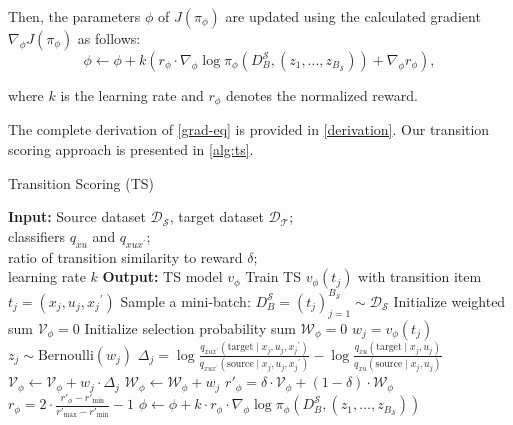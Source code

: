 Then, the parameters $\phi$ of $J\left(\pi_{\phi}\right)$ are updated using the calculated gradient $\nabla_{\phi} J\left(\pi_{\phi}\right)$ as follows:
\begin{equation}
\label{eq:phi_update}
\phi \leftarrow \phi + k \left(r_{\phi} \cdot \nabla_{\phi} \log \pi_{\phi}(D_B^{\mathcal{S}}, (z_1, \ldots, z_{B_{\mathcal{S}}})) + \nabla_{\phi} r_\phi \right),
\end{equation}

where $k$ is the learning rate and $r_{\phi}$ denotes the normalized reward. 

The complete derivation of \autoref{grad-eq} is provided in \autoref{derivation}. Our transition scoring approach is presented in \autoref{alg:ts}.


\begin{algorithm}[!ht]
\caption{Transition Scoring (TS)}
\label{alg:ts}
\begin{algorithmic}[1]
\State \textbf{Input:} Source dataset $\mathcal{D_S}$, target dataset $\mathcal{D_T}$; \\classifiers $q_{xu}$  and $q_{xu{x}^{\prime}}$; \\ratio of transition similarity to reward $\delta$; \\learning rate $k$
\State \textbf{Output:} TS model $v_{\phi}$
\State Train TS $v_{\phi}(t_j)$ with transition item $t_j = (x_j, u_j, {x_{j}}^{\prime})$
    \State Sample a mini-batch: $D_B^{\mathcal{S}}=(t_j)_{j=1}^{B_{\mathcal{S}}} \sim \mathcal{D_S}$
    \State Initialize weighted sum $\mathcal{V}_{\phi} = 0$
    \State Initialize selection probability sum $\mathcal{W}_{\phi} = 0$
        \State $w_j = v_{\phi}(t_j)$
        \State $z_j \sim \text{Bernoulli}(w_j)$
        \State $\Delta_j = \log \frac{q_{xu{x}^{\prime}}(\text{target} \mid x_j,u_j,{x_{j}}^{\prime})}{q_{xu{x}^{\prime}}(\text{source} \mid x_j,u_j,{x_{j}}^{\prime})} - \log \frac{q_{xu}(\text{target} \mid x_j,u_j)}{q_{xu}(\text{source} \mid x_j,u_j)}$
        \State $\mathcal{V}_{\phi} \leftarrow \mathcal{V}_{\phi} + w_j \cdot \Delta_j$
        \State $\mathcal{W}_{\phi} \leftarrow \mathcal{W}_{\phi} + w_j$
    \EndFor
    \State $r'_{\phi} = \delta \cdot \mathcal{V}_{\phi} + (1 - \delta) \cdot \mathcal{W}_{\phi}$
    \State $r_{\phi} = 2 \cdot \frac{r'_{\phi} - r'_{\min}}{r'_{\max} - r'_{\min}} - 1$
    \State $\phi \leftarrow \phi + k \cdot r_{\phi} \cdot \nabla_{\phi} \log \pi_{\phi}(D_B^{\mathcal{S}}, (z_1, \ldots, z_{B_{\mathcal{S}}}))$
\EndWhile
\end{algorithmic}
\end{algorithm}




